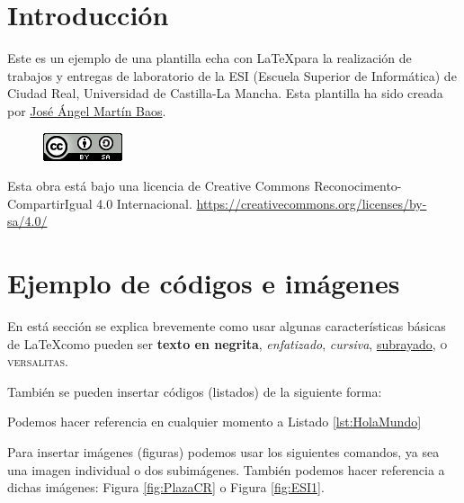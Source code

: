 \documentclass[11pt]{article}
\begin{document}
\begin{titlepage}
	\vfill
	
\end{titlepage}


\tableofcontents
\pagebreak


\section{Introducción}
Este es un ejemplo de una plantilla echa con \LaTeX para la realización de trabajos y entregas de laboratorio de la ESI (Escuela Superior de Informática) de Ciudad Real, Universidad de Castilla-La Mancha. Esta plantilla ha sido creada por \href{https://github.com/JoseAngelMartinB}{José Ángel Martín Baos}.


\begin{figure}[H] 
	\centering
	\includegraphics[angle=0]{licencia}
\end{figure}	
Esta obra está bajo una licencia de Creative Commons Reconocimento-CompartirIgual 4.0 Internacional.
\href{https://creativecommons.org/licenses/by-sa/4.0/}{https://creativecommons.org/licenses/by-sa/4.0/}


\section{Ejemplo de códigos e imágenes}
En está sección se explica brevemente como usar algunas características básicas de \LaTeX como pueden ser \textbf{texto en negrita}, \emph{enfatizado}, \textit{cursiva}, \underline{subrayado}, \textsc{o versalitas}.

También se pueden insertar códigos (listados) de la siguiente forma:


Podemos hacer referencia en cualquier momento a Listado \ref{lst:HolaMundo}

Para insertar imágenes (figuras) podemos usar los siguientes comandos, ya sea una imagen individual o dos subimágenes. También podemos hacer referencia a dichas imágenes: Figura \ref{fig:PlazaCR} o Figura \ref{fig:ESI1}.
\end{document}
